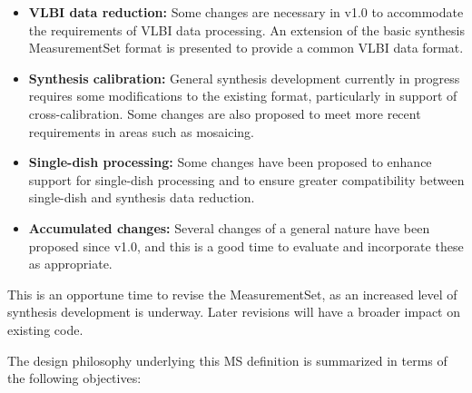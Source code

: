 \documentclass{article}
\begin{document}
\begin{itemize}

\item{{\bf VLBI data reduction:} Some changes are necessary in v1.0 to
accommodate the requirements of VLBI data processing. An extension of
the basic synthesis MeasurementSet format is presented to provide a
common VLBI data format.}

\item{{\bf Synthesis calibration:} General synthesis development
currently in progress requires some modifications to the existing
format, particularly in support of cross-calibration. Some changes
are also proposed to meet more recent requirements in areas such as mosaicing.}

\item{{\bf Single-dish processing:} Some changes have been proposed to
enhance support for single-dish processing and to ensure greater
compatibility between single-dish and synthesis data reduction.}

\item{{\bf Accumulated changes:} Several changes of a general nature
have been proposed since v1.0, and this is a good time to evaluate
and incorporate these as appropriate.}

\end{itemize}

This is an opportune time to revise the MeasurementSet, as an
increased level of synthesis development is underway. Later revisions
will have a broader impact on existing code.

The design philosophy underlying this MS definition is summarized in
terms of the following objectives:
\end{document}
